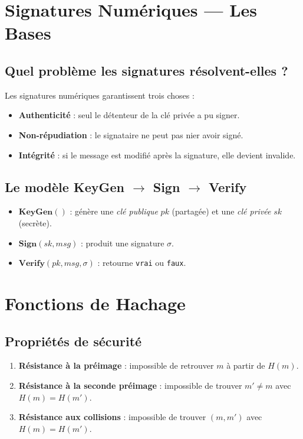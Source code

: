 \documentclass[11pt,a4paper]{article}
\begin{document}
\section{Signatures Numériques --- Les Bases}

\subsection{Quel problème les signatures résolvent-elles ?}

Les signatures numériques garantissent trois choses :
\begin{itemize}
  \item \textbf{Authenticité} : seul le détenteur de la clé privée a pu signer.
  \item \textbf{Non-répudiation} : le signataire ne peut pas nier avoir signé.
  \item \textbf{Intégrité} : si le message est modifié après la signature, elle devient invalide.
\end{itemize}

\subsection{Le modèle KeyGen $\to$ Sign $\to$ Verify}

\begin{itemize}
  \item $\mathbf{KeyGen}()$ : génère une \emph{clé publique} $pk$ (partagée) et une \emph{clé privée} $sk$ (secrète).
  \item $\mathbf{Sign}(sk, msg)$ : produit une signature $\sigma$.
  \item $\mathbf{Verify}(pk, msg, \sigma)$ : retourne \texttt{vrai} ou \texttt{faux}.
\end{itemize}

\section{Fonctions de Hachage}

\subsection{Propriétés de sécurité}

\begin{enumerate}
  \item \textbf{Résistance à la préimage} : impossible de retrouver $m$ à partir de $H(m)$.
  \item \textbf{Résistance à la seconde préimage} : impossible de trouver $m' \neq m$ avec $H(m) = H(m')$.
  \item \textbf{Résistance aux collisions} : impossible de trouver $(m, m')$ avec $H(m) = H(m')$.
\end{enumerate}
\end{document}
